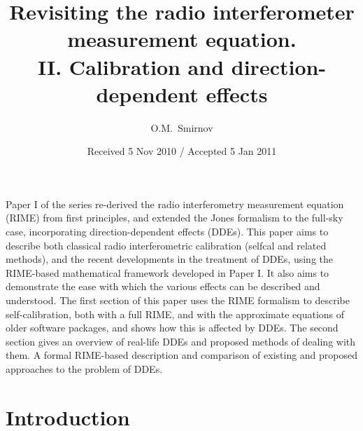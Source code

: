 \documentclass{aa}
\begin{document}
\title{Revisiting the radio interferometer measurement equation.\\II. Calibration and direction-dependent effects}

\author{O.M.\ Smirnov}


\date{Received 5 Nov 2010 / Accepted 5 Jan 2011}


\abstract%
{Paper I of the series re-derived the radio interferometry measurement equation (RIME) from first principles, and extended the Jones
formalism to the full-sky case, incorporating direction-dependent effects (DDEs).}
{This paper aims to describe both classical radio interferometric calibration (selfcal and related methods), and the
recent developments in the treatment of DDEs, using the RIME-based mathematical framework developed in Paper I. It also
aims to demonstrate the ease with which the various effects can be described and understood.}
{The first section of this paper uses the RIME formalism to describe self-calibration, both with 
a full RIME, and with the approximate equations of older software packages, and shows how this is affected 
by DDEs. The second section gives an overview of real-life DDEs and proposed methods of dealing with them.}
{A formal RIME-based description and comparison of existing and proposed approaches to the problem of DDEs.}
{}


\maketitle

\section*{Introduction}
\end{document}
